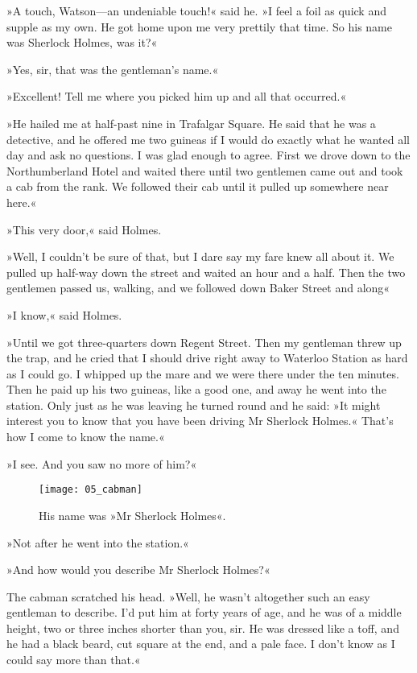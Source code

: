 »A touch, Watson—an undeniable touch!« said he. »I feel a foil as quick and supple as my own. He got home upon me very prettily that time. So his name was Sherlock Holmes, was it?«

»Yes, sir, that was the gentleman's name.«

»Excellent! Tell me where you picked him up and all that occurred.«

»He hailed me at half-past nine in Trafalgar Square. He said that he was a detective, and he offered me two guineas if I would do exactly what he wanted all day and ask no questions. I was glad enough to agree. First we drove down to the Northumberland Hotel and waited there until two gentlemen came out and took a cab from the rank. We followed their cab until it pulled up somewhere near here.«

»This very door,« said Holmes.

»Well, I couldn't be sure of that, but I dare say my fare knew all about it. We pulled up half-way down the street and waited an hour and a half. Then the two gentlemen passed us, walking, and we followed down Baker Street and along\longdash«

»I know,« said Holmes.

»Until we got three-quarters down Regent Street. Then my gentleman threw up the trap, and he cried that I should drive right away to Waterloo Station as hard as I could go. I whipped up the mare and we were there under the ten minutes. Then he paid up his two guineas, like a good one, and away he went into the station. Only just as he was leaving he turned round and he said: »It might interest you to know that you have been driving Mr Sherlock Holmes.« That's how I come to know the name.«

»I see. And you saw no more of him?«

\begin{figure}[tbh!]
\centering
\texttt{[image: 05\_cabman]}
\caption{His name was »Mr Sherlock Holmes«.}
\end{figure}

»Not after he went into the station.«

»And how would you describe Mr Sherlock Holmes?«

The cabman scratched his head. »Well, he wasn't altogether such an easy gentleman to describe. I'd put him at forty years of age, and he was of a middle height, two or three inches shorter than you, sir. He was dressed like a toff, and he had a black beard, cut square at the end, and a pale face. I don't know as I could say more than that.«

